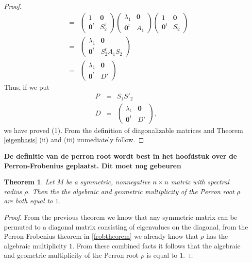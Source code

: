 \documentclass[a4paper,11pt]{report}
\newtheorem{theorem}{Theorem}[section]
\begin{document}
\begin{proof}
\begin{eqnarray*}
&=& \left(
\begin{array}{c|c}
1 & \mathbf{0} \\ \hline
\mathbf{0}^t & S^t_2
\end{array}\right) 
\left(
\begin{array}{c|c}
\lambda_1 & \mathbf{0} \\ \hline
\mathbf{0}^t & A_1
\end{array}\right) 
 \left(
\begin{array}{c|c}
1 & \mathbf{0} \\ \hline
\mathbf{0}^t & S_2
\end{array}\right) \\
&=& 
 \left(
\begin{array}{c|c}
\lambda_1 & \mathbf{0} \\ \hline
\mathbf{0}^t & S^t_2A_1S_2
\end{array}\right) \\
&=&
 \left(
\begin{array}{c|c}
\lambda_1 & \mathbf{0} \\ \hline
\mathbf{0}^t & D'\end{array}\right) 
\end{eqnarray*}
Thus, if we put
\begin{eqnarray*}
P &=& S_1S'_2\\
D &=& \left(
\begin{array}{c|c}
\lambda_1 & \mathbf{0} \\ \hline
\mathbf{0}^t & D'\end{array}\right),
\end{eqnarray*}
we have proved (1). From the definition of diagonalizable matrices and Theorem \ref{eigenbasis} 
(ii) and (iii) immediately follow.
\end{proof}
\textbf{De definitie van de perron root wordt best in het hoofdstuk over de Perron-Frobenius geplaatst. Dit moet nog gebeuren}
\begin{theorem} 
  Let $M$ be a symmetric, nonnegative $n\times n$ matrix with spectral radius $\rho$. Then 
  the the algebraic and geometric multiplicity of the Perron root $\rho$ are 
  both equal to $1$.
\end{theorem}
\begin{proof}
From the previous theorem we know that any symmetric matrix can be permuted
to a diagonal matrix consisting of eigenvalues on the diagonal, from the Perron-Frobenius theorem in \ref{frobtheorem} we already 
  know that $\rho$ has the algebraic multiplicity $1$. From these combined facts 
  it follows that the algebraic and geometric multiplicity of the Perron root $\rho$ 
  is equal to $1$.
\end{proof}
\end{document}
